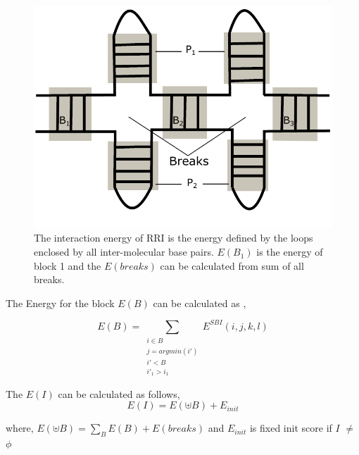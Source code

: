 \documentclass[twoside,a4paper]{report}
\numberwithin{equation}{section}
\begin{document}
	\begin{figure}[tb]
		\includegraphics[width=0.5\linewidth]{break.pdf}
		\centering
		\caption{The interaction energy of RRI is the energy defined by the loops enclosed by all inter-molecular base pairs. $E(B_1)$ is the energy of block 1 and the $E(breaks)$ can be calculated from sum of all breaks.  }
		\label{fig:break}
	\end{figure}

		
	 The Energy for the block $E(B)$ can be calculated as  ,
	
%	
%	
	
	
	\begin{equation}
	\label{eq:equ1}
	E(B) =  \sum_{\substack{i \in B \\  j = argmin(i') \\ i' < B \\ i'_1 > i_1 }}E^{SBI}(i,j,k,l)
	\end{equation}	
	
	
	
		The $E(I)$ can be calculated as follows,
		\begin{equation}
	\label{eq:equ2}
		E(I) = E(  \uplus  B) + E_{init} 	
	\end{equation}	
	
	\begin{center}
		where, $E(  \uplus  B) = \sum_B E(B) + E(breaks)$ and $E_{init}$ is fixed init score if $I$ $\neq$ $\phi$ 
	\end{center}
\end{document}
